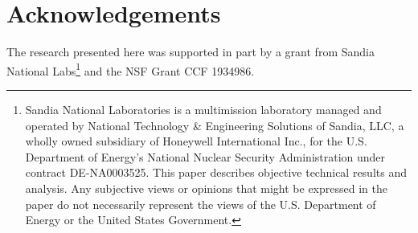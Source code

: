 \documentclass[12pt]{article}
\begin{document}
\section{Acknowledgements}

The research presented here was supported in part by a grant from Sandia National Labs\footnote{Sandia National Laboratories is a multimission laboratory managed and operated by National Technology \& Engineering Solutions of Sandia, LLC, a wholly owned subsidiary of Honeywell International Inc., for the U.S. Department of Energy’s National Nuclear Security Administration under contract DE-NA0003525.  This paper describes objective technical results and analysis. Any subjective views or opinions that might be expressed in the paper do not necessarily represent the views of the U.S. Department of Energy or the United States Government.} and the NSF Grant CCF 1934986.
\end{document}
